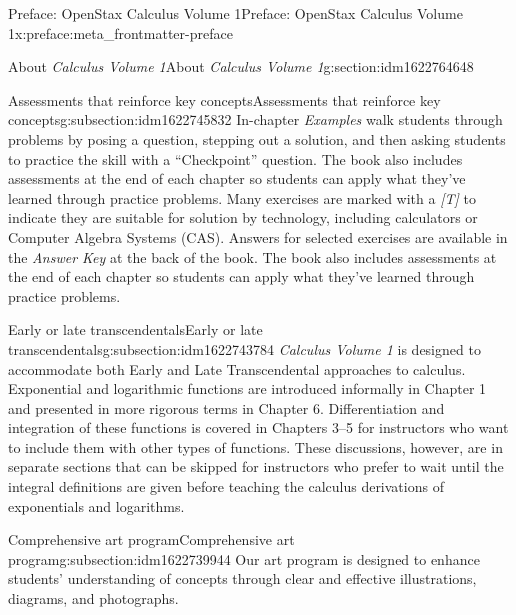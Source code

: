 \documentclass[oneside,10pt,]{book}
\numberwithin{equation}{section}
\begin{document}
\begin{preface}{Preface: OpenStax Calculus Volume 1}{}{Preface: OpenStax Calculus Volume 1}{}{}{x:preface:meta_frontmatter-preface}
\begin{sectionptx}{About \emph{Calculus Volume 1}}{}{About \emph{Calculus Volume 1}}{}{}{g:section:idm1622764648}
\typeout{************************************************}
%
\begin{subsectionptx}{Assessments that reinforce key concepts}{}{Assessments that reinforce key concepts}{}{}{g:subsection:idm1622745832}
In-chapter \emph{Examples} walk students through problems by posing a question, stepping out a solution, and then asking students to practice the skill with a “Checkpoint” question. The book also includes assessments at the end of each chapter so students can apply what they’ve learned through practice problems. Many exercises are marked with a \emph{[T]} to indicate they are suitable for solution by technology, including calculators or Computer Algebra Systems (CAS). Answers for selected exercises are available in the \emph{Answer Key} at the back of the book. The book also includes assessments at the end of each chapter so students can apply what they’ve learned through practice problems.%
\end{subsectionptx}
%
%
\typeout{************************************************}
\typeout{************************************************}
%
\begin{subsectionptx}{Early or late transcendentals}{}{Early or late transcendentals}{}{}{g:subsection:idm1622743784}
\emph{Calculus Volume 1} is designed to accommodate both Early and Late Transcendental approaches to calculus. Exponential and logarithmic functions are introduced informally in Chapter 1 and presented in more rigorous terms in Chapter 6. Differentiation and integration of these functions is covered in Chapters 3–5 for instructors who want to include them with other types of functions. These discussions, however, are in separate sections that can be skipped for instructors who prefer to wait until the integral definitions are given before teaching the calculus derivations of exponentials and logarithms.%
\end{subsectionptx}
%
%
\typeout{************************************************}
\typeout{************************************************}
%
\begin{subsectionptx}{Comprehensive art program}{}{Comprehensive art program}{}{}{g:subsection:idm1622739944}
Our art program is designed to enhance students’ understanding of concepts through clear and effective illustrations, diagrams, and photographs.%
\begin{image}{0.25}{0.5}{0.25}%

\end{image}
\end{subsectionptx}
\end{sectionptx}
\end{preface}
\end{document}
